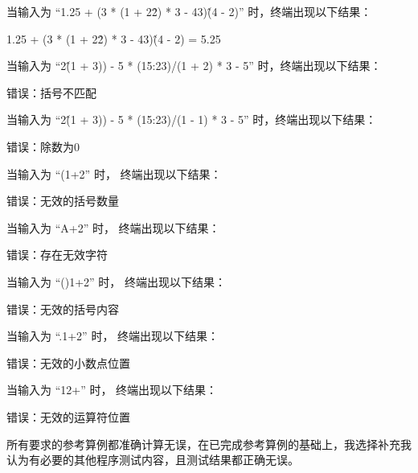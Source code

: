 \documentclass[UTF8]{ctexart}
\begin{document}
当输入为 “1.25 + (3 * (1 + 2\^2) * 3 - 43)\^(4 - 2)” 时，终端出现以下结果：\newline

1.25 + (3 * (1 + 2\^2) * 3 - 43)\^(4 - 2) = 5.25\newline

当输入为 “2\^(1 + 3)) - 5 *  (15:23)/(1 + 2) * 3 - 5” 时，终端出现以下结果：\newline

错误：括号不匹配\newline

当输入为 “2\^(1 + 3)) - 5 *  (15:23)/(1 - 1) * 3 - 5” 时，终端出现以下结果：\newline

错误：除数为0\newline

当输入为 “(1+2” 时， 终端出现以下结果：\newline

错误：无效的括号数量\newline

当输入为 “A+2” 时， 终端出现以下结果：\newline

错误：存在无效字符\newline

当输入为 “()1+2” 时， 终端出现以下结果：\newline

错误：无效的括号内容\newline

当输入为 “.1+2” 时， 终端出现以下结果：\newline

错误：无效的小数点位置\newline

当输入为 “12+” 时， 终端出现以下结果：\newline

错误：无效的运算符位置\newline

所有要求的参考算例都准确计算无误，在已完成参考算例的基础上，我选择补充我认为有必要的其他程序测试内容，且测试结果都正确无误。
\end{document}
